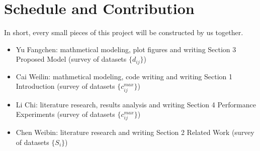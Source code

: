 \section{Schedule and Contribution}

In short, every small pieces of this project will be constructed by us together.
\begin{itemize}
    \item Yu Fangchen: mathmetical modeling, plot figures and writing Section 3 Proposed Model (survey of datasets $\{d_{ij}\}$) 
    \item Cai Weilin: mathmetical modeling, code writing and writing Section 1 Introduction (survey of datasets $\{c_{ij}^{max}\}$) 
    \item Li Chi: literature research, results analysis and writing Section 4 Performance Experiments (survey of datasets $\{c_{ij}^{max}\}$) 
    \item Chen Weibin: literature research and writing Section 2 Related Work (survey of datasets $\{S_i\}$) 
\end{itemize}
